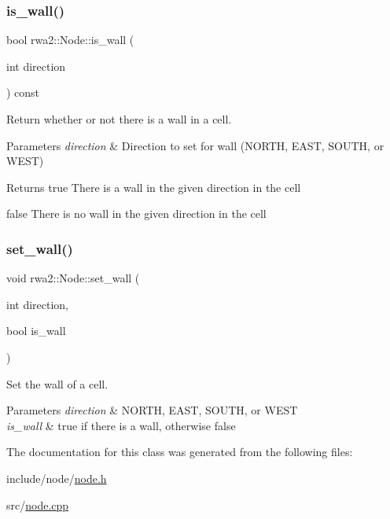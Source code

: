 \subsubsection{\texorpdfstring{is\+\_\+wall()}{is\_wall()}}
{\footnotesize\ttfamily bool rwa2\+::\+Node\+::is\+\_\+wall (\begin{DoxyParamCaption}\item[{int}]{direction }\end{DoxyParamCaption}) const}



Return whether or not there is a wall in a cell. 


\begin{DoxyParams}{Parameters}
{\em direction} & Direction to set for wall (N\+O\+R\+TH, E\+A\+ST, S\+O\+U\+TH, or W\+E\+ST) \\
\hline
\end{DoxyParams}
\begin{DoxyReturn}{Returns}
true There is a wall in the given direction in the cell 

false There is no wall in the given direction in the cell 
\end{DoxyReturn}
\mbox{\label{classrwa2_1_1_node_a9e887221d02616392f572dd4018b71ed}} 
\subsubsection{\texorpdfstring{set\+\_\+wall()}{set\_wall()}}
{\footnotesize\ttfamily void rwa2\+::\+Node\+::set\+\_\+wall (\begin{DoxyParamCaption}\item[{int}]{direction,  }\item[{bool}]{is\+\_\+wall }\end{DoxyParamCaption})}



Set the wall of a cell. 


\begin{DoxyParams}{Parameters}
{\em direction} & N\+O\+R\+TH, E\+A\+ST, S\+O\+U\+TH, or W\+E\+ST \\
\hline
{\em is\+\_\+wall} & true if there is a wall, otherwise false \\
\hline
\end{DoxyParams}


The documentation for this class was generated from the following files\+:\begin{DoxyCompactItemize}
\item 
include/node/\hyperlink{node_8h}{node.\+h}\item 
src/\hyperlink{node_8cpp}{node.\+cpp}\end{DoxyCompactItemize}
